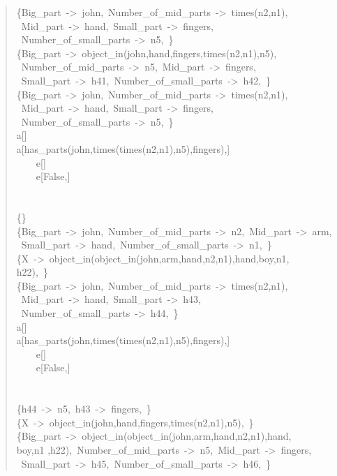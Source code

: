 \begin{quote}
\{Big\_part~->~john,~Number\_of\_mid\_parts~->~times(n2,n1),\\ ~Mid\_part~->~hand,~Small\_part~->~fingers,\\~Number\_of\_small\_parts~->~n5,~\}\\
\{Big\_part~->~object\_in(john,hand,fingers,times(n2,n1),n5),\\ ~Number\_of\_mid\_parts~->~n5,~Mid\_part~->~fingers,\\~Small\_part~->~h41,~Number\_of\_small\_parts~->~h42,~\}\\
\{Big\_part~->~john,~Number\_of\_mid\_parts~->~times(n2,n1),\\~Mid\_part~->~hand,~Small\_part~->~fingers,\\~Number\_of\_small\_parts~->~n5,~\}\\
a[]\\
a[has\_parts(john,times(times(n2,n1),n5),fingers),]\\
~~~~e[]\\
~~~~e[False,]\\
~\\
~\\
\{\}\\
\{Big\_part~->~john,~Number\_of\_mid\_parts~->~n2,~Mid\_part~->~arm,\\~Small\_part~->~hand,~Number\_of\_small\_parts~->~n1,~\}\\
\{X~->~object\_in(object\_in(john,arm,hand,n2,n1),hand,boy,n1,\\h22),~\}\\
\{Big\_part~->~john,~Number\_of\_mid\_parts~->~times(n2,n1),\\ ~Mid\_part~->~hand,~Small\_part~->~h43,\\~Number\_of\_small\_parts~->~h44,~\}\\
a[]\\
a[has\_parts(john,times(times(n2,n1),n5),fingers),]\\
~~~~e[]\\
~~~~e[False,]\\
~\\
~\\
\{h44~->~n5,~h43~->~fingers,~\}\\
\{X~->~object\_in(john,hand,fingers,times(n2,n1),n5),~\}\\
\{Big\_part~->~object\_in(object\_in(john,arm,hand,n2,n1),hand,\\ boy,n1 ,h22),~Number\_of\_mid\_parts~->~n5,~Mid\_part~->~fingers,\\~Small\_part~->~h45,~Number\_of\_small\_parts~->~h46,~\}\\

\end{quote}
